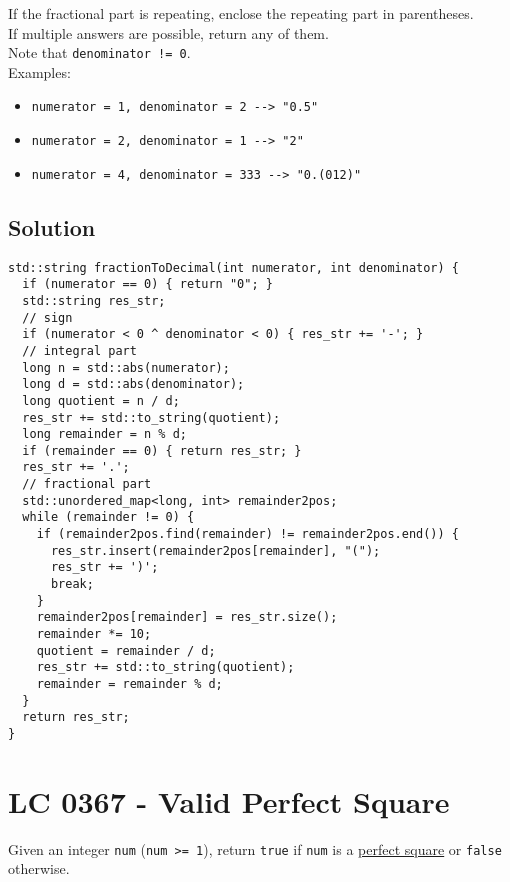If the fractional part is repeating, enclose the repeating part in parentheses.\\

If multiple answers are possible, return any of them.\\

Note that {\colorbox{CodeBackground}{\lstinline|denominator != 0|}}.\\

Examples:
\begin{itemize}
\item {\colorbox{CodeBackground}{\lstinline|numerator = 1, denominator = 2 --> "0.5"|}}
\item {\colorbox{CodeBackground}{\lstinline|numerator = 2, denominator = 1 --> "2"|}}
\item {\colorbox{CodeBackground}{\lstinline|numerator = 4, denominator = 333 --> "0.(012)"|}}
\end{itemize}

\subsection*{Solution}
\begin{lstlisting}
std::string fractionToDecimal(int numerator, int denominator) {
  if (numerator == 0) { return "0"; }
  std::string res_str;
  // sign
  if (numerator < 0 ^ denominator < 0) { res_str += '-'; }
  // integral part
  long n = std::abs(numerator);
  long d = std::abs(denominator);
  long quotient = n / d;
  res_str += std::to_string(quotient);
  long remainder = n % d;
  if (remainder == 0) { return res_str; }
  res_str += '.';
  // fractional part
  std::unordered_map<long, int> remainder2pos;
  while (remainder != 0) {
    if (remainder2pos.find(remainder) != remainder2pos.end()) {
      res_str.insert(remainder2pos[remainder], "(");
      res_str += ')';
      break;
    }
    remainder2pos[remainder] = res_str.size();
    remainder *= 10;
    quotient = remainder / d;
    res_str += std::to_string(quotient);
    remainder = remainder % d;
  }
  return res_str;
}
\end{lstlisting}

\section{LC 0367 - Valid Perfect Square}\label{lc0367}
Given an integer {\colorbox{CodeBackground}{\lstinline|num|}} ({\colorbox{CodeBackground}{\lstinline|num >= 1|}}), return {\colorbox{CodeBackground}{\lstinline|true|}} if {\colorbox{CodeBackground}{\lstinline|num|}} is a \ul{perfect square} or {\colorbox{CodeBackground}{\lstinline|false|}} otherwise.\\

